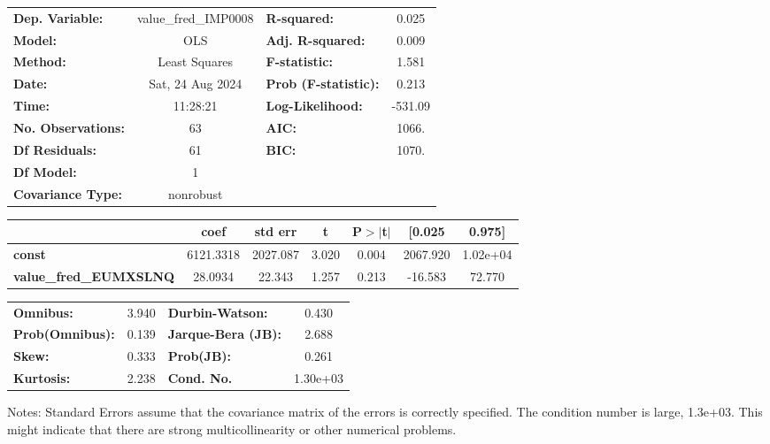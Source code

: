 \begin{center}
\begin{tabular}{lclc}
\toprule
\textbf{Dep. Variable:}        & value\_fred\_IMP0008 & \textbf{  R-squared:         } &     0.025   \\
\textbf{Model:}                &         OLS          & \textbf{  Adj. R-squared:    } &     0.009   \\
\textbf{Method:}               &    Least Squares     & \textbf{  F-statistic:       } &     1.581   \\
\textbf{Date:}                 &   Sat, 24 Aug 2024   & \textbf{  Prob (F-statistic):} &    0.213    \\
\textbf{Time:}                 &       11:28:21       & \textbf{  Log-Likelihood:    } &   -531.09   \\
\textbf{No. Observations:}     &            63        & \textbf{  AIC:               } &     1066.   \\
\textbf{Df Residuals:}         &            61        & \textbf{  BIC:               } &     1070.   \\
\textbf{Df Model:}             &             1        & \textbf{                     } &             \\
\textbf{Covariance Type:}      &      nonrobust       & \textbf{                     } &             \\
\bottomrule
\end{tabular}
\begin{tabular}{lcccccc}
                               & \textbf{coef} & \textbf{std err} & \textbf{t} & \textbf{P$> |$t$|$} & \textbf{[0.025} & \textbf{0.975]}  \\
\midrule
\textbf{const}                 &    6121.3318  &     2027.087     &     3.020  &         0.004        &     2067.920    &     1.02e+04     \\
\textbf{value\_fred\_EUMXSLNQ} &      28.0934  &       22.343     &     1.257  &         0.213        &      -16.583    &       72.770     \\
\bottomrule
\end{tabular}
\begin{tabular}{lclc}
\textbf{Omnibus:}       &  3.940 & \textbf{  Durbin-Watson:     } &    0.430  \\
\textbf{Prob(Omnibus):} &  0.139 & \textbf{  Jarque-Bera (JB):  } &    2.688  \\
\textbf{Skew:}          &  0.333 & \textbf{  Prob(JB):          } &    0.261  \\
\textbf{Kurtosis:}      &  2.238 & \textbf{  Cond. No.          } & 1.30e+03  \\
\bottomrule
\end{tabular}
\end{center}

Notes: \newline
 [1] Standard Errors assume that the covariance matrix of the errors is correctly specified. \newline
 [2] The condition number is large, 1.3e+03. This might indicate that there are \newline
 strong multicollinearity or other numerical problems.